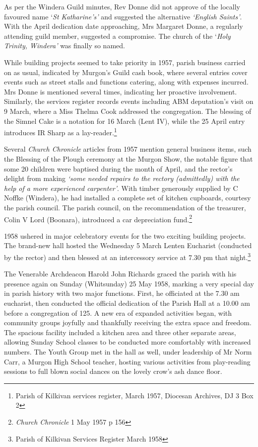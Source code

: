 As per the Windera Guild minutes, Rev Donne did not approve of the locally favoured name `\emph{St Katharine's'} and suggested the alternative \emph{`English Saints'}. With the April dedication date approaching, Mrs Margaret Donne, a regularly attending guild member, suggested a compromise. The church of the `\emph{Holy Trinity, Windera'} was finally so named.



While building projects seemed to take priority in 1957, parish business carried on as usual, indicated by Murgon's Guild cash book, where several entries cover events such as street stalls and functions catering, along with expenses incurred. Mrs Donne is mentioned several times, indicating her proactive involvement. Similarly, the services register records events including ABM deputation's visit on 9 March, where a Miss Thelma Cook addressed the congregation. The blessing of the Simnel Cake is a notation for 16 March (Lent IV), while the 25 April entry introduces IR Sharp as a lay-reader.\footnote{Parish of Kilkivan services register, March 1957, Diocesan Archives, DJ 3 Box 2}


Several \emph{Church Chronicle} articles from 1957 mention general business items, such the Blessing of the Plough ceremony at the Murgon Show, the notable figure that some 20 children were baptised during the month of April, and the rector's delight from making \emph{`some needed repairs to the rectory (admittedly) with the help of a more experienced carpenter'}. With timber generously supplied by C Noffke (Windera), he had installed a complete set of kitchen cupboards, courtesy the parish council. The parish council, on the recommendation of the treasurer, Colin V Lord (Boonara), introduced a car depreciation fund.\footnote{\emph{Church Chronicle} 1 May 1957 p 156}


1958 ushered in major celebratory events for the two exciting building projects. The brand-new hall hosted the Wednesday 5 March Lenten Eucharist (conducted by the rector) and then blessed at an intercessory service at 7.30 pm that night.\footnote{Parish of Kilkivan Services Register March 1958}


The Venerable Archdeacon Harold John Richards graced the parish with his presence again on Sunday (Whitsunday) 25 May 1958, marking a very special day in parish history with two major functions. First, he officiated at the 7.30 am eucharist, then conducted the official dedication of the Parish Hall at a 10.00 am before a congregation of 125. A new era of expanded activities began, with community groups joyfully and thankfully receiving the extra space and freedom. The spacious facility included a kitchen area and three other separate areas, allowing Sunday School classes to be conducted more comfortably with increased numbers. The Youth Group met in the hall as well, under leadership of Mr Norm Carr, a Murgon High School teacher, hosting various activities from play-reading sessions to full blown social dances on the lovely crow's ash dance floor.



